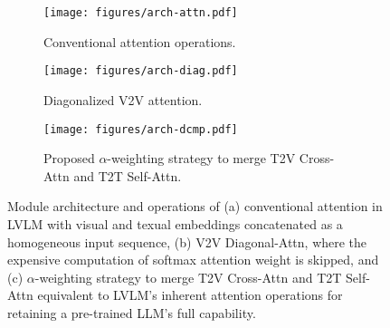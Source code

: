 



\begin{figure*}[t]
\centering
\begin{subfigure}{.22\linewidth}
  \centering
  \texttt{[image: figures/arch-attn.pdf]}
  \caption{Conventional attention operations.}\label{fig:arch-attn}
\end{subfigure}
\hfill
\begin{subfigure}{.22\linewidth}
  \centering
  \texttt{[image: figures/arch-diag.pdf]}
  \caption{Diagonalized V2V attention.}\label{fig:arch-diag}
\end{subfigure}
\hfill
\begin{subfigure}{.45\linewidth}
  \centering
  \texttt{[image: figures/arch-dcmp.pdf]}
  \caption{Proposed $\alpha$-weighting strategy to merge T2V Cross-Attn and T2T Self-Attn.}\label{fig:arch-dcmp}
\end{subfigure}
\caption{
Module architecture and operations of
(a) conventional attention in LVLM with visual and texual embeddings concatenated as a homogeneous input sequence,
(b) V2V Diagonal-Attn, where the expensive computation of softmax attention weight is skipped, and
(c) $\alpha$-weighting strategy to merge T2V Cross-Attn and T2T Self-Attn equivalent to LVLM's inherent attention operations for retaining a pre-trained LLM's full capability.
}\label{fig:arch}
\end{figure*}


